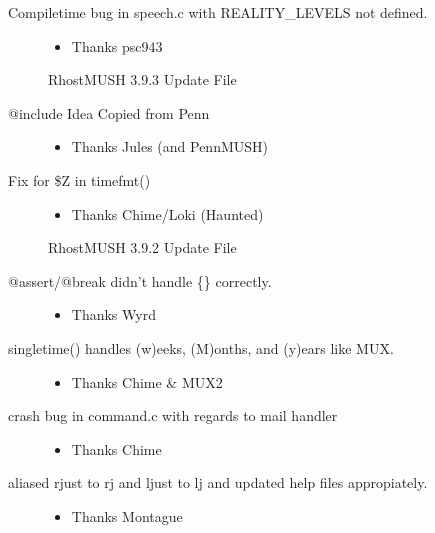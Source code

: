 \documentclass[letterpaper,10pt,english]{sphinxmanual}
\begin{document}
\begin{description}
\item[{Compiletime bug in speech.c with REALITY\_LEVELS not defined.}] \leavevmode\begin{itemize}
\item {} 
\sphinxAtStartPar
Thanks psc943

\end{itemize}

\sphinxAtStartPar
RhostMUSH 3.9.3 Update File

\item[{@include \textendash{} Idea Copied from Penn}] \leavevmode\begin{itemize}
\item {} 
\sphinxAtStartPar
Thanks Jules (and PennMUSH)

\end{itemize}

\item[{Fix for \$Z in timefmt()}] \leavevmode\begin{itemize}
\item {} 
\sphinxAtStartPar
Thanks Chime/Loki (Haunted)

\end{itemize}

\sphinxAtStartPar
RhostMUSH 3.9.2 Update File

\item[{@assert/@break didn’t handle \{\} correctly.}] \leavevmode\begin{itemize}
\item {} 
\sphinxAtStartPar
Thanks Wyrd

\end{itemize}

\item[{singletime() handles (w)eeks, (M)onths, and (y)ears like MUX.}] \leavevmode\begin{itemize}
\item {} 
\sphinxAtStartPar
Thanks Chime \& MUX2

\end{itemize}

\item[{crash bug in command.c with regards to mail handler}] \leavevmode\begin{itemize}
\item {} 
\sphinxAtStartPar
Thanks Chime

\end{itemize}

\item[{aliased rjust to rj and ljust to lj and updated help files appropiately.}] \leavevmode\begin{itemize}
\item {} 
\sphinxAtStartPar
Thanks Montague

\end{itemize}

\end{description}
\end{document}
